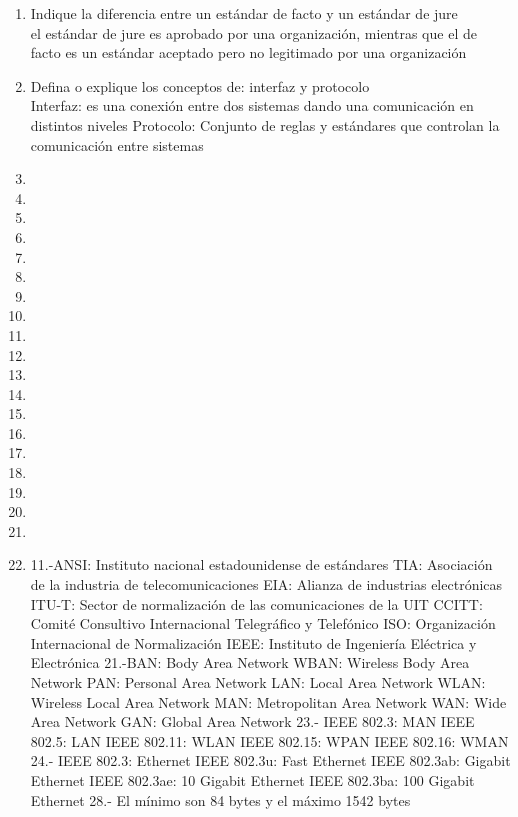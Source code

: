 \documentclass{udparticle}
\begin{document}
\begin{enumerate}
\item Indique la diferencia entre un estándar de  facto y un estándar de  jure\\
    el estándar de jure es aprobado por una organización, mientras que el de facto es un estándar aceptado pero 
    no legitimado por una organización
\item Defina o explique los conceptos de: interfaz y protocolo\\
    Interfaz: es una conexión entre dos sistemas dando una comunicación en distintos niveles
    Protocolo: Conjunto de reglas y estándares que controlan la comunicación entre sistemas
\item
\item
\item
\item
\item
\item
\item
\item
\item
\item
\item
\item
\item
\item
\item
\item
\item
\item
\item
\item

11.-ANSI: Instituto nacional estadounidense de estándares
TIA: Asociación de la industria de telecomunicaciones
EIA: Alianza de industrias electrónicas
ITU-T: Sector de normalización de las comunicaciones de la UIT
CCITT: Comité Consultivo Internacional Telegráfico y Telefónico
ISO: Organización Internacional de Normalización
IEEE: Instituto de Ingeniería Eléctrica y Electrónica
21.-BAN: Body Area Network
WBAN: Wireless Body Area Network
PAN: Personal Area Network
LAN: Local Area Network
WLAN: Wireless Local Area Network
MAN: Metropolitan Area Network
WAN: Wide Area Network
GAN: Global Area Network
23.- IEEE 802.3: MAN
IEEE 802.5: LAN
IEEE 802.11: WLAN
IEEE 802.15: WPAN
IEEE 802.16: WMAN
24.- IEEE 802.3: Ethernet
IEEE   802.3u: Fast Ethernet
IEEE  802.3ab: Gigabit Ethernet
IEEE 802.3ae: 10 Gigabit Ethernet
IEEE 802.3ba: 100 Gigabit Ethernet
28.- El mínimo son 84 bytes y el máximo 1542 bytes

\end{enumerate}
\end{document}

